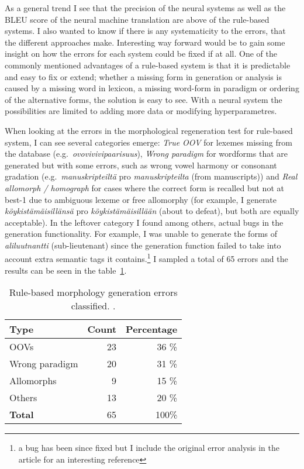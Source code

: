 \documentclass[a4paper,notitlepage]{article}
\begin{document}
As a general trend I see that the precision of the neural systems as well as the
BLEU score of the neural machine translation are above of the rule-based
systems. I also wanted to know if there is any systematicity to the errors, that
the different approaches make. Interesting way forward would be to gain some
insight on how the errors for each system could be fixed if at all.  One of the
commonly mentioned advantages of a rule-based system is that it is predictable
and easy to fix or extend; whether a missing form in generation or analysis is
caused by a missing word in lexicon, a missing word-form in paradigm or ordering
of the alternative forms, the solution is easy to see.  With a neural system the
possibilities are limited to adding more data or modifying hyperparametres.

When looking at the errors in the morphological regeneration test for rule-based
system, I can see several categories emerge: \textit{True OOV} for lexemes
missing from the database (e.g.\ \textit{ovovivivipaarisuus}), \textit{Wrong
paradigm} for wordforms that are generated but with some errors, such as wrong
vowel harmony or consonant gradation (e.g.\ \textit{manuskripteiltä} pro
\textit{manuskripteilta} (from manuscripts)) and \textit{Real allomorph /
homograph} for cases where the correct form is recalled but not at best-1 due to
ambiguous lexeme or free allomorphy (for example, I generate
\textit{köykistämäisillänsä} pro \textit{köykistämäisillään} (about to defeat),
but both are equally acceptable).  In the leftover category I found among
others, actual bugs in the generation functionality. For example, I was unable
to generate the forms of \textit{aliluutnantti} (sub-lieutenant) since the
generation function failed to take into account extra semantic tags it
contains.\footnote{a bug has been since fixed but I include the original error
analysis in the article for an interesting reference} I sampled a total of 65
errors and the results can be seen in the table~\ref{table:morph-gen-errors}.

\begin{table}
\begin{centering}
    \begin{tabular}{lrr}
        \toprule
        Type & \bf Count & \bf Percentage \\
        \midrule
        OOVs & 23 & 36 \% \\
        Wrong paradigm & 20 & 31 \% \\
        Allomorphs & 9 & 15 \% \\
        Others & 13 & 20 \% \\
        \midrule
        \bf Total & 65 & 100\% \\
        \bottomrule
    \end{tabular}
    \caption{Rule-based morphology generation errors classified.
\label{table:morph-gen-errors}.}
\end{centering}
\end{table}
\end{document}
